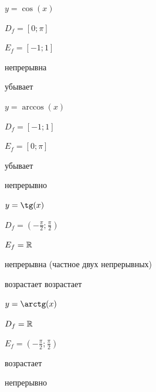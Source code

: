 

\begin{theorem}
	$y = \cos(x)$

	$D_f = [0; \pi]$

	$E_f = [-1; 1]$

	непрерывна

	убывает

	$y = \arccos(x)$

	$D_f = [-1; 1]$

	$E_f = [0; \pi]$

	убывает

	непрерывно
\end{theorem}

\begin{theorem}
	$y = \tg(x)$

	$D_f = (-\frac{\pi}{2}; \frac{\pi}{2})$

	$E_f = \mathbb{R}$

	непрерывна (частное двух непрерывных)

	возрастает возрастает

	$y = \arctg(x)$

	$D_f = \mathbb{R}$

	$E_f = (-\frac{\pi}{2}; \frac{\pi}{2})$

	возрастает

	непрерывно

\end{theorem}

